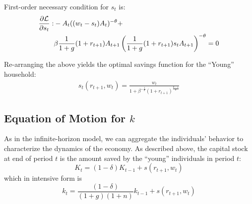 \documentclass[11pt]{article}
\begin{document}
First-order necessary condition for $s_t$ is:
\begin{align}
\frac{\partial \mathcal{L}}{\partial s_t}:& -A_t((w_t - s_t)A_t)^{-\theta} + \\ \notag
&\beta\frac{1}{1 + g}(1 + r_{t+1})A_{t+1}\left(\frac{1}{1 + g}(1 + r_{t+1})s_{t}A_{t+1}\right)^{-\theta} = 0
\end{align}

Re-arranging the above yields the optimal savings function for the ``Young'' household:
\begin{align}
s_t(r_{t+1}, w_t) = \frac{w_t}{1 + \beta^{-\frac{1}{\theta}}(1 + r_{t+1})^{\frac{\theta-1}{\theta}}}
\end{align}

\subsection{Equation of Motion for $k$}
As in the infinite-horizon model, we can aggregate the individuals' behavior to characterize the dynamics of the economy. As described above, the capital stock at end of period $t$ is the amount saved by the ``young'' individuals in period $t$:
\begin{equation}
K_t = (1 - \delta)K_{t-1} + s(r_{t+1}, w_t)
\end{equation}
which in intensive form is
\begin{equation}
k_t = \frac{(1 - \delta)}{(1 + g)(1 + n)}k_{t-1} + s(r_{t+1}, w_t)
\end{equation}
\end{document}

